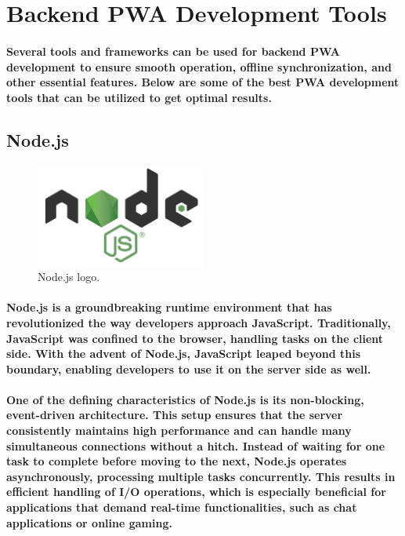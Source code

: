 \documentclass[12pt,a4paper]{article}
\begin{document}
    \section{Backend PWA Development Tools}

    \paragraph{Several tools and frameworks can be used for backend PWA development to ensure smooth operation, offline synchronization, and other essential features. Below are some of the best PWA development tools that can be utilized to get optimal results.}

    \subsection{Node.js}

    \begin{figure}[h!]
      \centering
      \includegraphics[width=0.5\textwidth]{node.png}
      \caption{Node.js logo.}
    \end{figure}

    \paragraph{Node.js is a groundbreaking runtime environment that has revolutionized the way developers approach JavaScript. Traditionally, JavaScript was confined to the browser, handling tasks on the client side. With the advent of Node.js, JavaScript leaped beyond this boundary, enabling developers to use it on the server side as well.}
    
    \paragraph{One of the defining characteristics of Node.js is its non-blocking, event-driven architecture. This setup ensures that the server consistently maintains high performance and can handle many simultaneous connections without a hitch. Instead of waiting for one task to complete before moving to the next, Node.js operates asynchronously, processing multiple tasks concurrently. This results in efficient handling of I/O operations, which is especially beneficial for applications that demand real-time functionalities, such as chat applications or online gaming.}
    
\end{document}
